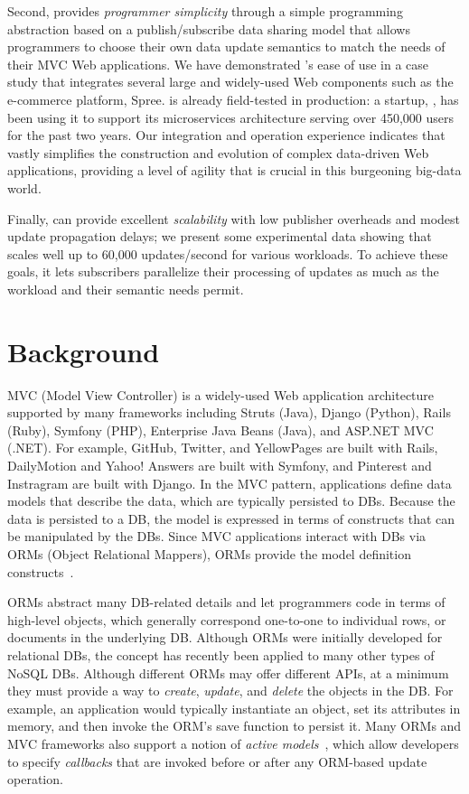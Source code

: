 Second, \synapse provides
\emph{programmer simplicity} through a simple programming abstraction
based on a publish/subscribe data sharing model that allows programmers to choose their own data update semantics to match the needs of their MVC Web applications.
We have demonstrated \synapse's ease of use in a case study that integrates several large and widely-used Web components such as
the e-commerce platform, Spree.
\synapse is already field-tested in production: a startup, \crowdtap, has been using it to support its microservices architecture serving over 450,000 users for the past two years.
Our integration and operation experience indicates that \synapse vastly
simplifies the construction and evolution of complex data-driven Web
applications, providing a level of agility that is crucial in this
burgeoning big-data world.

Finally, \synapse can provide excellent \emph{scalability} with low publisher
overheads and modest update propagation delays; we present some experimental
data showing that \synapse scales well up to 60,000 updates/second for various
workloads.  To achieve these goals, it lets subscribers parallelize their
processing of updates as much as the workload and their semantic needs
permit.

\section{Background}
\label{s:motivation}

MVC (Model View Controller) is a widely-used Web application architecture supported by many frameworks including Struts (Java), Django (Python), Rails (Ruby),
Symfony (PHP), Enterprise Java Beans (Java), and ASP.NET MVC (.NET).
For example, GitHub, Twitter, and YellowPages are built with Rails,
DailyMotion and Yahoo! Answers are built with Symfony, and Pinterest
and Instragram are built with Django.
In the MVC pattern, applications define data models that describe the 
data, which are typically
persisted to DBs.  Because the data is persisted to a DB, the 
model is expressed in terms of constructs that can be manipulated by
the DBs.  Since MVC applications interact with DBs via ORMs (Object Relational Mappers), ORMs
provide the model definition constructs~\cite{Barcia:2008aa}.

ORMs abstract many DB-related
details and let programmers code in terms of high-level objects, which
generally correspond one-to-one to individual rows, or documents
in the underlying DB.  Although
ORMs were initially developed for relational DBs, the concept has recently
been applied to many other types of NoSQL DBs.  
Although different ORMs may offer different APIs, at a minimum they must
provide a way to {\em create}, {\em update}, and {\em delete} the objects in
the DB.  For example, an application would typically instantiate an
object, set its attributes in memory, and then invoke the ORM's save
function to persist it.  Many ORMs and MVC frameworks also support a notion of 
{\em active models}~\cite{Fowler:2002:PEA:579257}, which allow
developers to specify {\em callbacks} that are invoked before or after
any ORM-based update operation.  

